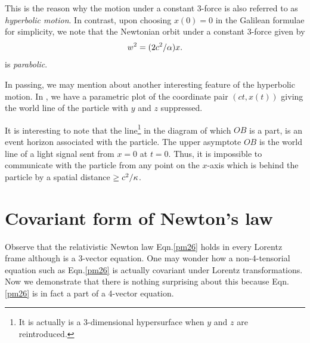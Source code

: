 This is the reason why the motion under a constant  
3-force 
is also referred to as \textsl{hyperbolic motion}. In 
contrast, upon choosing $ x(0) =0$ in the Galilean 
formulae 
for simplicity, we note that the Newtonian orbit under 
a 
constant 3-force given by
\begin{align}\label{pm42}
 w^2=(2c^2/{\alpha})x.
\end{align}
is \textsl{parabolic}.

In passing, we may mention about another interesting 
feature 
of the hyperbolic motion. In , we have 
a 
parametric plot of the coordinate  pair $(ct, x(t))$ 
giving 
the world line of the particle with $y$ and $z$ 
suppressed.

It is interesting to note that the line\footnote{It is 
actually is a 3-dimensional hypersurface when $y$ and 
$z$ 
are reintroduced.} in the diagram of which $OB$ is a 
part, 
is an {event horizon} associated with the particle. 
The 
upper asymptote $OB$ is the world line of a light 
signal 
sent from $ x=0$ at $t=0$. Thus, it is impossible to 
communicate with the particle from any point on the 
$x$-axis which is behind the particle by a spatial 
distance 
$\geq c^2/{\kappa}$.

\section{Covariant form of Newton's law}
Observe that the relativistic Newton law 
Eqn.\eqref{pm26} 
holds in every Lorentz frame although is a 3-vector 
equation. One may wonder how a non-4-tensorial equation 
such 
as Eqn.\eqref{pm26} is actually covariant under 
Lorentz 
transformations. Now we demonstrate that there is 
nothing 
surprising about this because Eqn.\eqref{pm26} is in 
fact a 
part of a {4-vector equation}.

